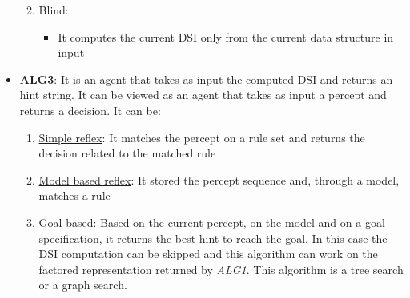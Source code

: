\begin{itemize}
\begin{enumerate}
\begin{itemize}
		\end{itemize}
		\item Blind:
		\begin{itemize}
			\item It computes the current DSI only from the current data structure in input
		\end{itemize}
	\end{enumerate}
	\item \textbf{ALG3}: It is an agent that takes as input the computed DSI and returns an hint string. It can be viewed as an agent that takes as input a percept and returns a decision. It can be:
	\begin{enumerate}
		\item \underline{Simple reflex}: It matches the percept on a rule set and returns the decision related to the matched rule
		\item \underline{Model based reflex}: It stored the percept sequence and, through a model, matches a rule
		\item \underline{Goal based}: Based on the current percept, on the model and on a goal specification, it returns the best hint to reach the goal. In this case the DSI computation can be skipped and this algorithm can work on the factored representation returned by \textit{ALG1}. This algorithm is a tree search or a graph search.
	\end{enumerate}
\end{itemize}
